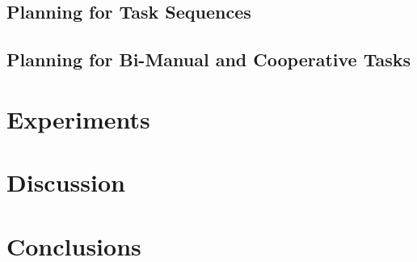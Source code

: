 \documentclass{aamas2015}
\begin{document}

\newpage 
\subsection{Planning for Task Sequences}

\newpage
\subsection{Planning for Bi-Manual and Cooperative Tasks}

\newpage
\section{Experiments}
 
 \newpage
\section{Discussion}
\newpage
\section{Conclusions}



\end{document}
